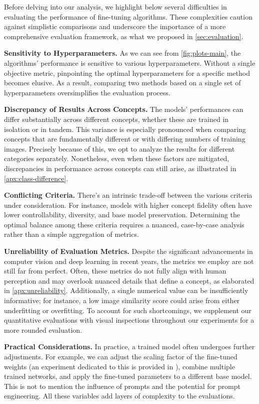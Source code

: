 Before delving into our analysis, we highlight below several difficulties in evaluating the performance of fine-tuning algorithms. These complexities caution against simplistic comparisons and underscore the importance of a more comprehensive evaluation framework, as what we proposed in \cref{sec:evaluation}.



\textbf{Sensitivity to Hyperparameters.}
    As we can see from \cref{fig:plots-main}, the algorithms' performance is sensitive to various hyperparameters.
    Without a single objective metric, pinpointing the optimal hyperparameters for a specific method becomes elusive. As a result, comparing two methods based on a single set of hyperparameters oversimplifies the evaluation process.

\textbf{Discrepancy of Results Across Concepts.}
    The models' performances can differ substantially across different concepts, whether these are trained in isolation or in tandem.
    This variance is especially pronounced when comparing concepts that are fundamentally different or with differing numbers of training images.
    Precisely because of this, we opt to analyze the results for different categories separately.
    Nonetheless, even when these factors are mitigated, discrepancies in performance across concepts can still arise, as illustrated in \cref{apx:class-difference}.

\textbf{Conflicting Criteria.}
    There's an intrinsic trade-off between the various criteria under consideration. For instance, models with higher concept fidelity often have lower controllability, diversity, and base model preservation. Determining the optimal balance among these criteria requires a nuanced, case-by-case analysis rather than a simple aggregation of metrics.
    
 \textbf{Unreliability of Evaluation Metrics.}
    Despite the significant advancements in computer vision and deep learning in recent years, the metrics we employ are not still far from perfect. Often, these metrics do not fully align with human perception and may overlook nuanced details that define a concept, as elaborated in \cref{apx:unreliability}. Additionally, a single numerical value can be insufficiently informative; for instance, a low image similarity score could arise from either underfitting or overfitting. To account for such shortcomings,
    we supplement our quantitative evaluations with visual inspections throughout our experiments for a more rounded evaluation. %


\textbf{Practical Considerations.}
    In practice, a trained model often undergoes further adjustments. 
    For example, we can adjust the scaling factor of the fine-tuned weights (an experiment dedicated to this is provided in \needref), combine multiple trained networks, and apply the fine-tuned parameters to a different base model. This is not to mention the influence of prompts and the potential for prompt engineering. All these variables add layers of complexity to the evaluations.